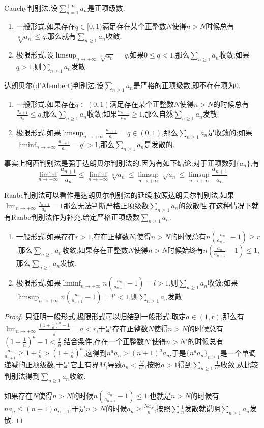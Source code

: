 Cauchy判别法.设$\sum_{n=1}^{+\infty}a_n$是正项级数.
\begin{enumerate}
	\item 一般形式.如果存在$q\in[0,1)$满足存在某个正整数$N$使得$n>N$时候总有$\sqrt[n]{a_n}\le q$.那么就有$\sum_{n\ge1}a_n$收敛.
	\item 极限形式.设$\limsup_{n\to+\infty}\sqrt[n]{a_n}=q$,如果$0\le q<1$,那么$\sum_{n\ge1}a_n$收敛;如果$q>1$,则$\sum_{n\ge1}a_n$发散.
\end{enumerate}

达朗贝尔(d'Alembert)判别法.设$\sum_{n\ge1}a_n$是严格的正项级数,即不存在项为0.
\begin{enumerate}
	\item 一般形式.如果存在$q\in(0,1)$满足存在某个正整数$N$使得$n>N$的时候总有$\frac{a_{n+1}}{a_n}\le q$,那么$\sum_{n\ge1}a_n$收敛;如果$\frac{a_{n+1}}{a_n}\ge1$,那么自然$\sum_{n\ge1}a_n$发散.
	\item 极限形式.如果$\limsup_{n\to+\infty}\frac{a_{n+1}}{a_n}=q\in(0,1)$,那么$\sum_{n\ge1}a_n$是收敛的;如果$\liminf_{n\to+\infty}\frac{a_{n+1}}{a_n}=q'>1$,那么$\sum_{n\ge1}a_n$是发散的.
\end{enumerate}

事实上柯西判别法是强于达朗贝尔判别法的.因为有如下结论:对于正项数列$\{a_n\}$,有$$\liminf_{n\to+\infty}\frac{a_{n+1}}{a_n}\le\liminf_{n\to+\infty}\sqrt[n]{a_n}\le\limsup_{n\to+\infty}\sqrt[n]{a_n}\le\limsup_{n\to+\infty}\frac{a_{n+1}}{a_n}$$

Raabe判别法可以看作是达朗贝尔判别法的延续.按照达朗贝尔判别法,如果$\lim_{n\to+\infty}\frac{a_{n+1}}{a_n}=1$那么无法判断严格正项级数$\sum_{n\ge1}a_n$的敛散性.在这种情况下就有Raabe判别法作为补充.给定严格正项级数$\sum_{n\ge1}a_n$.
\begin{enumerate}
	\item 一般形式.如果存在$r>1$,存在正整数$N$,使得$n>N$的时候总有$n\left(\frac{a_{n}}{a_{n+1}}-1\right)\ge r$.那么$\sum_{n\ge1}a_n$收敛;如果存在正整数$N$使得$n>N$时候始终有$n\left(\frac{a_n}{a_{n+1}}-1\right)\le1$,那么$\sum_{n\ge1}a_n$发散.
	\item 极限形式.如果$\liminf_{n\to+\infty}n\left(\frac{a_n}{a_{n+1}}-1\right)=l>1$,则$\sum_{n\ge1}a_n$收敛;如果$\limsup_{n\to+\infty}n\left(\frac{a_n}{a_{n+1}}-1\right)=l'<1$,则$\sum_{n\ge1}a_n$发散.
\end{enumerate}
\begin{proof}
	
	只证明一般形式,极限形式可以归结到一般形式.取定$a\in(1,r)$,那么有$\lim_{n\to+\infty}\frac{\left(1+\frac{1}{n}\right)^a-1}{\frac{1}{n}}=a<r$,于是存在正整数$N$使得$n>N$的时候总有$\left(1+\frac{1}{n}\right)^a-1<\frac{r}{n}$.结合条件,存在一个正整数$N'$使得$n>N'$的时候总有$\frac{a_n}{a_{n+1}}\ge1+\frac{r}{n}>(1+\frac{1}{n})^a$,这得到$n^aa_n>(n+1)^aa_n$,于是$\{n^aa_n\}_{n\ge1}$是一个单调递减的正项级数,于是它上有界$M$,导致$a_n<\frac{M}{n^a}$,按照$a>1$得到$\sum_{n\ge1}\frac{1}{n^a}$收敛,从比较判别法得到$\sum_{n\ge1}a_n$收敛.
	
	如果存在$N$使得$n>N$的时候$n\left(\frac{a_n}{a_{n+1}}-1\right)\le1$,也就是$n>N$的时候有$na_n\le(n+1)a_{n+1}$,于是$n>N$的时候$a_n\ge\frac{Na_{N}}{n}$,按照$\sum\frac{1}{n}$发散就说明$\sum_{n\ge1}a_n$发散.
	
\end{proof}

